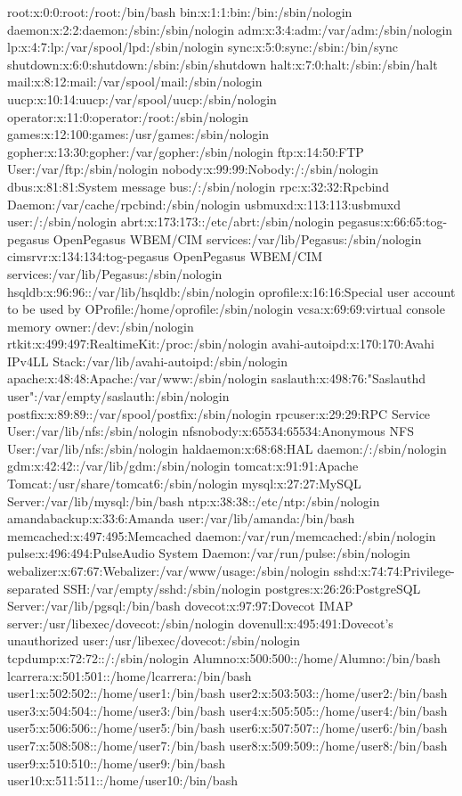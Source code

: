 \documentclass{memoir}
\begin{document}
root:x:0:0:root:/root:/bin/bash
bin:x:1:1:bin:/bin:/sbin/nologin
daemon:x:2:2:daemon:/sbin:/sbin/nologin
adm:x:3:4:adm:/var/adm:/sbin/nologin
lp:x:4:7:lp:/var/spool/lpd:/sbin/nologin
sync:x:5:0:sync:/sbin:/bin/sync
shutdown:x:6:0:shutdown:/sbin:/sbin/shutdown
halt:x:7:0:halt:/sbin:/sbin/halt
mail:x:8:12:mail:/var/spool/mail:/sbin/nologin
uucp:x:10:14:uucp:/var/spool/uucp:/sbin/nologin
operator:x:11:0:operator:/root:/sbin/nologin
games:x:12:100:games:/usr/games:/sbin/nologin
gopher:x:13:30:gopher:/var/gopher:/sbin/nologin
ftp:x:14:50:FTP User:/var/ftp:/sbin/nologin
nobody:x:99:99:Nobody:/:/sbin/nologin
dbus:x:81:81:System message bus:/:/sbin/nologin
rpc:x:32:32:Rpcbind Daemon:/var/cache/rpcbind:/sbin/nologin
usbmuxd:x:113:113:usbmuxd user:/:/sbin/nologin
abrt:x:173:173::/etc/abrt:/sbin/nologin
pegasus:x:66:65:tog-pegasus OpenPegasus WBEM/CIM services:/var/lib/Pegasus:/sbin/nologin
cimsrvr:x:134:134:tog-pegasus OpenPegasus WBEM/CIM services:/var/lib/Pegasus:/sbin/nologin
hsqldb:x:96:96::/var/lib/hsqldb:/sbin/nologin
oprofile:x:16:16:Special user account to be used by OProfile:/home/oprofile:/sbin/nologin
vcsa:x:69:69:virtual console memory owner:/dev:/sbin/nologin
rtkit:x:499:497:RealtimeKit:/proc:/sbin/nologin
avahi-autoipd:x:170:170:Avahi IPv4LL Stack:/var/lib/avahi-autoipd:/sbin/nologin
apache:x:48:48:Apache:/var/www:/sbin/nologin
saslauth:x:498:76:"Saslauthd user":/var/empty/saslauth:/sbin/nologin
postfix:x:89:89::/var/spool/postfix:/sbin/nologin
rpcuser:x:29:29:RPC Service User:/var/lib/nfs:/sbin/nologin
nfsnobody:x:65534:65534:Anonymous NFS User:/var/lib/nfs:/sbin/nologin
haldaemon:x:68:68:HAL daemon:/:/sbin/nologin
gdm:x:42:42::/var/lib/gdm:/sbin/nologin
tomcat:x:91:91:Apache Tomcat:/usr/share/tomcat6:/sbin/nologin
mysql:x:27:27:MySQL Server:/var/lib/mysql:/bin/bash
ntp:x:38:38::/etc/ntp:/sbin/nologin
amandabackup:x:33:6:Amanda user:/var/lib/amanda:/bin/bash
memcached:x:497:495:Memcached daemon:/var/run/memcached:/sbin/nologin
pulse:x:496:494:PulseAudio System Daemon:/var/run/pulse:/sbin/nologin
webalizer:x:67:67:Webalizer:/var/www/usage:/sbin/nologin
sshd:x:74:74:Privilege-separated SSH:/var/empty/sshd:/sbin/nologin
postgres:x:26:26:PostgreSQL Server:/var/lib/pgsql:/bin/bash
dovecot:x:97:97:Dovecot IMAP server:/usr/libexec/dovecot:/sbin/nologin
dovenull:x:495:491:Dovecot's unauthorized user:/usr/libexec/dovecot:/sbin/nologin
tcpdump:x:72:72::/:/sbin/nologin
Alumno:x:500:500::/home/Alumno:/bin/bash
lcarrera:x:501:501::/home/lcarrera:/bin/bash
user1:x:502:502::/home/user1:/bin/bash
user2:x:503:503::/home/user2:/bin/bash
user3:x:504:504::/home/user3:/bin/bash
user4:x:505:505::/home/user4:/bin/bash
user5:x:506:506::/home/user5:/bin/bash
user6:x:507:507::/home/user6:/bin/bash
user7:x:508:508::/home/user7:/bin/bash
user8:x:509:509::/home/user8:/bin/bash
user9:x:510:510::/home/user9:/bin/bash
user10:x:511:511::/home/user10:/bin/bash
\end{document}
